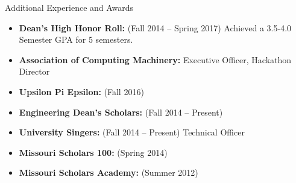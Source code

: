 \documentclass[]{mcdowellcv}
\begin{document}
    \begin{cvsection}{Additional Experience and Awards}
        \begin{cvsubsection}{}{}{}	
            \begin{itemize}
                \item \textbf{Dean's High Honor Roll:}  (Fall 2014 -- Spring 2017) Achieved a 3.5-4.0 Semester GPA for 5 semesters.
                \item \textbf{Association of Computing Machinery:} Executive Officer, Hackathon Director
                \item \textbf{Upsilon Pi Epsilon:}  (Fall 2016)
                \item \textbf{Engineering Dean's Scholars:} (Fall 2014 -- Present)
                \item \textbf{University Singers:} (Fall 2014 -- Present) Technical Officer
                \item \textbf{Missouri Scholars 100:} (Spring 2014)
                \item \textbf{Missouri Scholars Academy:} (Summer 2012)
            \end{itemize}
        \end{cvsubsection}
    \end{cvsection}
\end{document}
